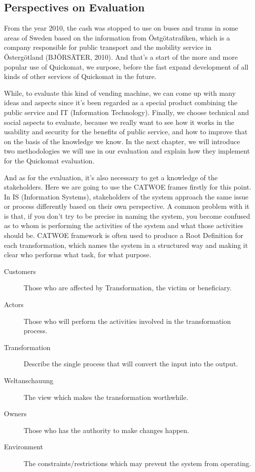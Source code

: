 \documentclass[twocolumn]{article}
\begin{document}
\subsection{Perspectives on Evaluation}
From the year 2010, the cash was stopped to use on buses and trams in some areas of Sweden based on the information from Östgötatrafiken, which is a company responsible for public transport and the mobility service in Östergötland (BJÖRSÄTER, 2010). And that’s a start of the more and more popular use of Quickomat, we surpose, before the fast expand development of all kinds of other services of Quickomat in the future. 

While, to evaluate this kind of vending machine, we can come up with many ideas and aspects since it’s been regarded as a special product combining the public service and IT (Information Technology). Finally, we choose technical and social aspects to evaluate, because we really want to see how it works in the usability and security for the benefits of public service, and how to improve that on the basis of the knowledge we know.  In the next chapter, we will introduce two methodologies we will use in our evaluation and explain how they implement for the Quickomat evaluation. 

And as for the evaluation, it's also necessary to get a knowledge of the stakeholders. Here we are going to use the CATWOE frames firstly for this point. In IS (Information Systems), stakeholders of the system approach the same issue or process differently based on their own perspective. A common problem with it is that, if you don’t try to be precise in naming the system, you become confused as to whom is performing the activities of the system and what those activities should be. CATWOE framework is often used to produce a Root Definition for each transformation, which names the system in a structured way and making it clear who performs what task, for what purpose.

\begin{description}
  \item[Customers]
    Those who are affected by Transformation, the victim or beneficiary.
  \item[Actors]
    Those who will perform the activities involved in the transformation process.
  \item[Transformation]
    Describe the single process that will convert the input into the output.
  \item[Weltanschauung]
    The view which makes the transformation worthwhile.
  \item[Owners]
    Those who has the authority to make changes happen.
  \item[Environment]
    The constraints/restrictions which may prevent the system from operating.
\end{description}
\end{document}
